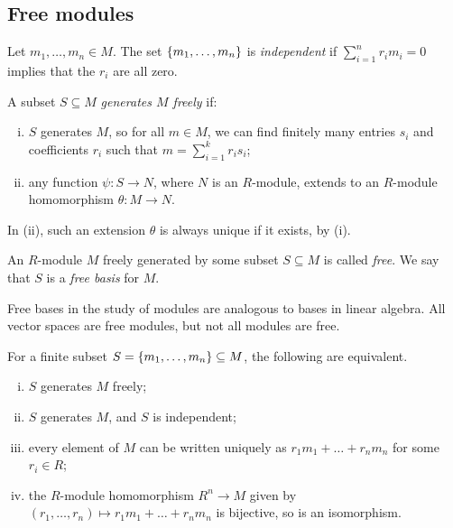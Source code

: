 \subsection{Free modules}
\begin{definition}
	Let \( m_1, \dots, m_n \in M \).
	The set \( \qty{m_1, \dots, m_n} \) is \textit{independent} if \( \sum_{i=1}^n r_i m_i = 0 \) implies that the \( r_i \) are all zero.
\end{definition}
\begin{definition}
	A subset \( S \subseteq M \) \textit{generates \( M \) freely} if:
	\begin{enumerate}[(i)]
		\item \( S \) generates \( M \), so for all \( m \in M \), we can find finitely many entries \( s_i \) and coefficients \( r_i \) such that \( m = \sum_{i=1}^k r_i s_i \);
		\item any function \( \psi \colon S \to N \), where \( N \) is an \( R \)-module, extends to an \( R \)-module homomorphism \( \theta \colon M \to N \).
	\end{enumerate}
\end{definition}
\begin{remark}
	In (ii), such an extension \( \theta \) is always unique if it exists, by (i).
\end{remark}
\begin{definition}
	An \( R \)-module \( M \) freely generated by some subset \( S \subseteq M \) is called \textit{free}.
	We say that \( S \) is a \textit{free basis} for \( M \).
\end{definition}
\begin{remark}
	Free bases in the study of modules are analogous to bases in linear algebra.
	All vector spaces are free modules, but not all modules are free.
\end{remark}
\begin{proposition}
	For a finite subset \( S = \qty{m_1, \dots, m_n} \subseteq M \), the following are equivalent.
	\begin{enumerate}[(i)]
		\item \( S \) generates \( M \) freely;
		\item \( S \) generates \( M \), and \( S \) is independent;
		\item every element of \( M \) can be written uniquely as \( r_1 m_1 + \dots + r_n m_n \) for some \( r_i \in R \);
		\item the \( R \)-module homomorphism \( R^n \to M \) given by \( (r_1, \dots, r_n) \mapsto r_1 m_1 + \dots + r_n m_n \) is bijective, so is an isomorphism.
	\end{enumerate}
\end{proposition}
